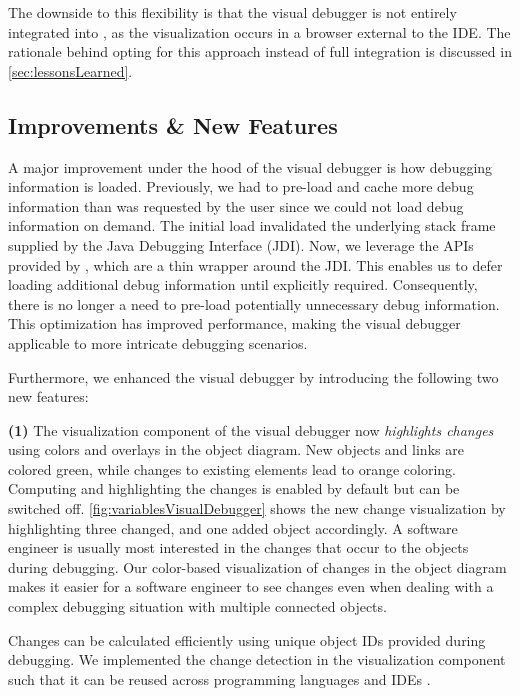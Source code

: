 \documentclass[sigconf]{acmart}
\begin{document}
The downside to this flexibility is that the visual debugger is not entirely integrated into \intellij{}, as the visualization occurs in a browser external to the IDE.
The rationale behind opting for this approach instead of full integration is discussed in \autoref{sec:lessonsLearned}.

\subsection{Improvements \& New Features} \label{subsec:improvements}
A major improvement under the hood of the visual debugger is how debugging information is loaded.
Previously, we had to pre-load and cache more debug information than was requested by the user since we could not load debug information on demand.
The initial load invalidated the underlying stack frame supplied by the Java Debugging Interface (JDI).
Now, we leverage the APIs provided by \intellij{}, which are a thin wrapper around the JDI.
This enables us to defer loading additional debug information until explicitly required.
Consequently, there is no longer a need to pre-load potentially unnecessary debug information.
This optimization has improved performance, making the visual debugger applicable to more intricate debugging scenarios.

Furthermore, we enhanced the visual debugger by introducing the following two new features:

\textbf{(1)} The visualization component of the visual debugger now \textit{highlights changes} using colors and overlays in the object diagram.
New objects and links are colored green, while changes to existing elements lead to orange coloring.
Computing and highlighting the changes is enabled by default but can be switched off.
\autoref{fig:variablesVisualDebugger} shows the new change visualization by highlighting three changed, and one added object accordingly.
A software engineer is usually most interested in the changes that occur to the objects during debugging.
Our color-based visualization of changes in the object diagram makes it easier for a software engineer to see changes even when dealing with a complex debugging situation with multiple connected objects.

Changes can be calculated efficiently using unique object IDs provided during debugging.
We implemented the change detection in the visualization component such that it can be reused across programming languages and IDEs \cite{timkrauterICSE2024Artifacts2023}.
\end{document}

